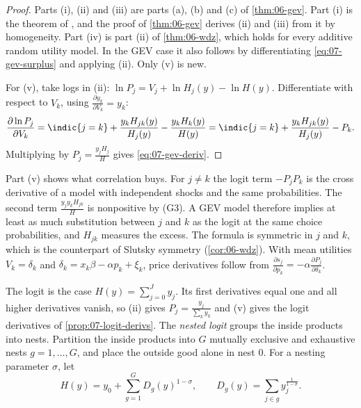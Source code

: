 \begin{proof}
Parts (i), (ii) and (iii) are parts (a), (b) and (c) of \cref{thm:06-gev}. Part (i) is the theorem of
\citet{McFadden1978}, and the proof of \cref{thm:06-gev} derives (ii) and (iii) from it by homogeneity. Part (iv) is
part (ii) of \cref{thm:06-wdz}, which holds for every additive random utility model. In the GEV case it also follows
by differentiating \eqref{eq:07-gev-surplus} and applying (ii). Only (v) is new.

For (v), take logs in (ii): $\ln P_j = V_j + \ln H_j(y) - \ln H(y)$. Differentiate with respect to $V_k$, using
$\frac{\partial y_k}{\partial V_k} = y_k$:
\begin{equation*}
\frac{\partial \ln P_j}{\partial V_k} = \indic\{j = k\} + \frac{y_k H_{jk}(y)}{H_j(y)} - \frac{y_k H_k(y)}{H(y)}
= \indic\{j = k\} + \frac{y_k H_{jk}(y)}{H_j(y)} - P_k .
\end{equation*}
Multiplying by $P_j = \frac{y_jH_j}{H}$ gives \eqref{eq:07-gev-deriv}.
\end{proof}

Part (v) shows what correlation buys. For $j \neq k$ the logit term $-P_jP_k$ is the cross derivative of a model
with independent shocks and the same probabilities. The second term $\frac{y_jy_kH_{jk}}{H}$ is nonpositive by
(G3). A GEV model therefore implies at least as much substitution between $j$ and $k$ as the logit at the same
choice probabilities, and $H_{jk}$ measures the excess. The formula is symmetric in $j$ and $k$, which is the
counterpart of Slutsky symmetry (\cref{cor:06-wdz}). With mean utilities $V_k = \delta_k$ and
$\delta_k = x_k\beta - \alpha p_k + \xi_k$, price derivatives follow from
$\frac{\partial s_j}{\partial p_k} = -\alpha\frac{\partial P_j}{\partial \delta_k}$.

The logit is the case $H(y) = \sum_{j=0}^J y_j$. Its first derivatives equal one and all higher derivatives vanish,
so (ii) gives $P_j = \frac{y_j}{\sum_k y_k}$ and (v) gives the logit derivatives of \cref{prop:07-logit-derivs}.
The \emph{nested logit} groups the inside products into nests. Partition the inside products into
$G$ mutually exclusive and exhaustive nests $g = 1, \dots, G$, and place the outside good alone in nest $0$. For
a nesting parameter $\sigma$, let
\begin{equation}\label{eq:07-nl-H}
H(y) = y_0 + \sum_{g=1}^G D_g(y)^{1 - \sigma}, \qquad D_g(y) = \sum_{j \in g} y_j^{\frac{1}{1-\sigma}} .
\end{equation}

